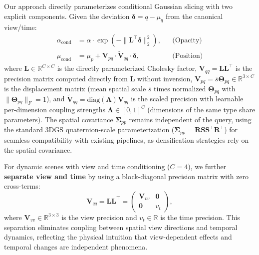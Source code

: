 \documentclass{article}
\theoremstyle{plain}
\theoremstyle{definition}
\theoremstyle{remark}
\begin{document}
Our approach directly parameterizes conditional Gaussian slicing with two explicit components. Given the deviation $\boldsymbol{\delta} = q - \mu_q$ from the canonical view/time:
\begin{align}
\alpha_{\text{cond}} &= \alpha \cdot \exp\left(-\|\mathbf{L}^\top \boldsymbol{\delta}\|_2^2\right), & &\text{(Opacity)} \\
\mu_{\text{cond}} &= \mu_p + \mathbf{V}_{pq} \cdot \tilde{\mathbf{V}}_{qq} \cdot \boldsymbol{\delta}, & &\text{(Position)} \end{align}
where $\mathbf{L} \in \mathbb{R}^{C \times C}$ is the directly parameterized Cholesky factor, $\mathbf{V}_{qq} = \mathbf{L}\mathbf{L}^\top$ is the precision matrix computed directly from $\mathbf{L}$ without inversion, $\mathbf{V}_{pq} = \bar{s}\boldsymbol{\Theta}_{pq} \in \mathbb{R}^{3 \times C}$ is the displacement matrix (mean spatial scale $\bar{s}$ times normalized $\boldsymbol{\Theta}_{pq}$ with $\|\boldsymbol{\Theta}_{pq}\|_F = 1$), and $\tilde{\mathbf{V}}_{qq} = \text{diag}(\boldsymbol{\Lambda}) \mathbf{V}_{qq}$ is the scaled precision with learnable per-dimension coupling strengths $\boldsymbol{\Lambda} \in [0,1]^C$ (dimensions of the same type share parameters). The spatial covariance $\boldsymbol{\Sigma}_{pp}$ remains independent of the query, using the standard 3DGS quaternion-scale parameterization ($\boldsymbol{\Sigma}_{pp} = \mathbf{R}\mathbf{S}\mathbf{S}^\top \mathbf{R}^\top$) for seamless compatibility with existing pipelines, as densification strategies rely on the spatial covariance.

For dynamic scenes with view and time conditioning ($C=4$), we further \textbf{separate view and time} by using a block-diagonal precision matrix with zero cross-terms:
\begin{equation}
\mathbf{V}_{qq} = \mathbf{L}\mathbf{L}^\top = \begin{pmatrix}
\mathbf{V}_{vv} & \mathbf{0} \\
\mathbf{0} & v_t
\end{pmatrix},
\end{equation}
where $\mathbf{V}_{vv} \in \mathbb{R}^{3 \times 3}$ is the view precision and $v_t \in \mathbb{R}$ is the time precision. This separation eliminates coupling between spatial view directions and temporal dynamics, reflecting the physical intuition that view-dependent effects and temporal changes are independent phenomena.
\end{document}
